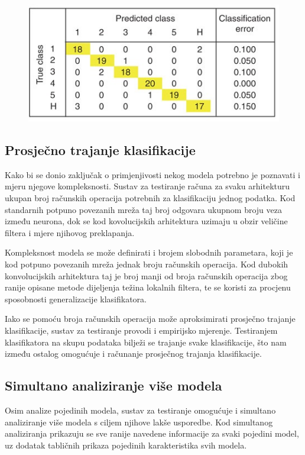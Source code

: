 \documentclass[lmodern, utf8, diplomski, numeric]{fer}
\begin{document}
\begin{figure}[ht!]
\centering
\includegraphics[width=13cm]{slike/confusion_matrix.jpg}
\caption{}
\end{figure}

\subsection{Prosječno trajanje klasifikacije}

Kako bi se donio zaključak o primjenjivosti nekog modela potrebno je poznavati i mjeru njegove kompleksnosti. Sustav za testiranje računa za svaku arhitekturu ukupan broj računskih operacija potrebnih za klasifikaciju jednog podatka. Kod standarnih potpuno povezanih mreža taj broj odgovara ukupnom broju veza između neurona, dok se kod kovolucijskih arhitektura uzimaju u obzir veličine filtera i mjere njihovog preklapanja. 

Kompleksnost modela se može definirati i brojem slobodnih parametara, koji je kod potpuno povezanih mreža jednak broju računskih operacija. Kod dubokih konvolucijskih arhitektura taj je broj manji od broja računskih operacija zbog ranije opisane metode dijeljenja težina lokalnih filtera, te se koristi za procjenu sposobnosti generalizacije klasifikatora.

Iako se pomoću broja računskih operacija može aproksimirati prosječno trajanje klasifikacije, sustav za testiranje provodi i empirijsko mjerenje. Testiranjem klasifikatora na skupu podataka bilježi se trajanje svake klasifikacije, što nam između ostalog omogućuje i računanje prosječnog trajanja klasifikacije.

\subsection{Simultano analiziranje više modela}

Osim analize pojedinih modela, sustav za testiranje omogućuje i simultano analiziranje više modela s ciljem njihove lakše usporedbe. Kod simultanog analiziranja prikazuju se sve ranije navedene informacije za svaki pojedini model, uz dodatak tabličnih prikaza pojedinih karakteristika svih modela. 
\end{document}
